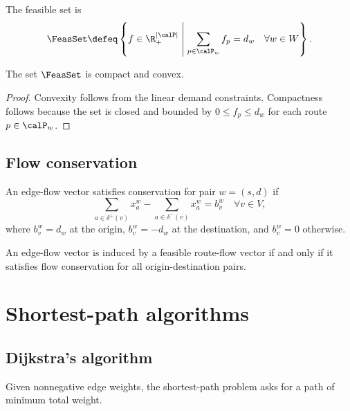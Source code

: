 \begin{definition}
The feasible set is
\[
\FeasSet \defeq \left\{ f \in \R^{|\calP|}_+ \;\middle|\; \sum_{p \in \calP_w} f_p = d_w \quad \forall w \in W \right\}.
\]
\end{definition}

\begin{proposition}\label{prop:omega_compact_convex}
The set $\FeasSet$ is compact and convex.
\end{proposition}

\begin{proof}
Convexity follows from the linear demand constraints. Compactness follows because the set is closed and bounded by $0 \leq f_p \leq d_w$ for each route $p \in \calP_w$.
\end{proof}

\subsection{Flow conservation}

\begin{definition}
An edge-flow vector satisfies conservation for pair $w=(s,d)$ if
\[
\sum_{a \in \delta^+(v)} x_a^w - \sum_{a \in \delta^-(v)} x_a^w = b_v^w \quad \forall v \in V,
\]
where $b_v^w=d_w$ at the origin, $b_v^w=-d_w$ at the destination, and $b_v^w=0$ otherwise.
\end{definition}

\begin{theorem}\label{thm:equivalencia}
An edge-flow vector is induced by a feasible route-flow vector if and only if it satisfies flow conservation for all origin-destination pairs.
\end{theorem}

\section{Shortest-path algorithms}

\subsection{Dijkstra's algorithm}

\begin{definition}
Given nonnegative edge weights, the shortest-path problem asks for a path of minimum total weight.
\end{definition}

